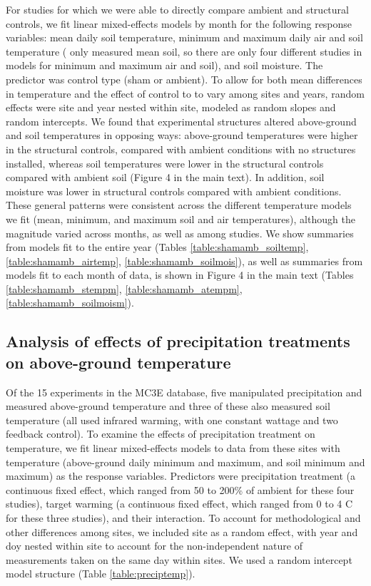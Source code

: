 \documentclass{article}
\begin{document}
\par For studies for which we were able to directly compare ambient and structural controls, we fit linear mixed-effects models by month for the following response variables: mean daily soil temperature, minimum and maximum daily air and soil temperature (\citet{farnsworth1995} only measured mean soil, so there are only four different studies in models for minimum and maximum air and soil), and soil moisture. The predictor was control type (sham or ambient). To allow for both mean differences in temperature and the effect of control to to vary among sites and years, random effects were site and year nested within site, modeled as random slopes and random intercepts. 
We found that experimental structures altered above-ground and soil temperatures in opposing ways: above-ground temperatures were higher in the structural controls, compared with ambient conditions with no structures installed, whereas soil temperatures were lower in the structural controls compared with ambient soil (Figure 4 in the main text).  In addition, soil moisture was lower in structural controls compared with ambient conditions. These general patterns were consistent across the different temperature models we fit (mean, minimum, and maximum soil and air temperatures), although the magnitude varied across months, as well as among studies. We show summaries from models fit to the entire year (Tables \ref{table:shamamb_soiltemp}, \ref{table:shamamb_airtemp}, \ref{table:shamamb_soilmois}), as well as summaries from models fit to each month of data, is shown in Figure 4 in the main text (Tables \ref{table:shamamb_stempm}, \ref{table:shamamb_atempm}, \ref{table:shamamb_soilmoism}).


\subsection* {Analysis of effects of precipitation treatments on above-ground temperature}
Of the 15 experiments in the MC3E database, five manipulated precipitation and measured above-ground temperature and three of these also measured soil temperature (all used infrared warming, with one constant wattage and two feedback control). To examine the effects of precipitation treatment on temperature, we fit linear mixed-effects models to data from these sites with temperature (above-ground daily minimum and maximum, and soil minimum and maximum) as the response variables. Predictors were precipitation treatment (a continuous fixed effect, which ranged from 50 to 200\% of ambient for these four studies), target warming (a continuous fixed effect, which ranged from 0 to 4 \degree C for these three studies), and their interaction. To account for methodological and other differences among sites, we included site as a random effect, with year and doy nested within site to account for the non-independent nature of measurements taken on the same day within sites. We used a random intercept model structure (Table \ref{table:preciptemp}). 
\end{document}
